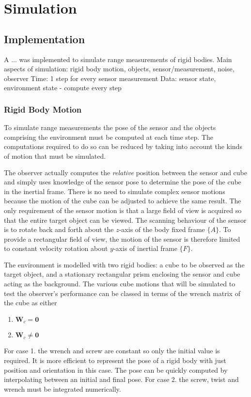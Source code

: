 \chapter{Simulation}
\section{Implementation}
A ... was implemented to simulate range measurements of rigid bodies. 
Main aspects of simulation: rigid body motion, objects, sensor/measurement, noise, observer
Time: 1 step for every sensor measurement
Data: sensor state, environment state - compute every step

\subsection{Rigid Body Motion}
To simulate range measurements the pose of the sensor and the objects comprising the environment must be computed at each time step. The computations required to do so can be reduced by taking into account the kinds of motion that must be simulated.

The observer actually computes the \textit{relative} position between the sensor and cube and simply uses knowledge of the sensor pose to determine the pose of the cube in the inertial frame. There is no need to simulate complex sensor motions because the motion of the cube can be adjusted to achieve the same result. The only requirement of the sensor motion is that a large field of view is acquired so that the entire target object can be viewed. The scanning behaviour of the sensor is to rotate back and forth about the $z$-axis of the body fixed frame $\{A\}$. To provide a rectangular field of view, the motion of the sensor is therefore limited to constant velocity rotation about $y$-axis of inertial frame $\{F\}$.

The environment is modelled with two rigid bodies: a cube to be observed as the target object, and a stationary rectangular prism enclosing the sensor and cube acting as the background. The various cube motions that will be simulated to test the observer's performance can be classed in terms of the wrench matrix of the cube as either
\begin{enumerate}
\item ${\textbf{W}_c} = \textbf{0}$
\item ${\textbf{W}_c} \neq \textbf{0}$
\end{enumerate}

For case 1. the wrench and screw are constant so only the initial value is required. It is more efficient to represent the pose of a rigid body with just position and orientation in this case. The pose can be quickly computed by interpolating between an initial and final pose. For case 2. the screw, twist and wrench must be integrated numerically.

